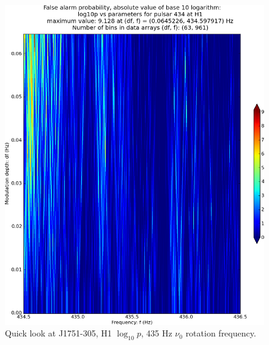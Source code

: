 \begin{figure}
\begin{center}
\includegraphics[width=0.68\paperwidth,height=0.48\paperheight]{plots/DFvsFresultsProb-H1_pulsar-434.eps}
\caption{
Quick look at J1751-305, H1 $\log_{10}p$, 435 Hz $\nu_0$ rotation frequency.}
\end{center}
\end{figure}


